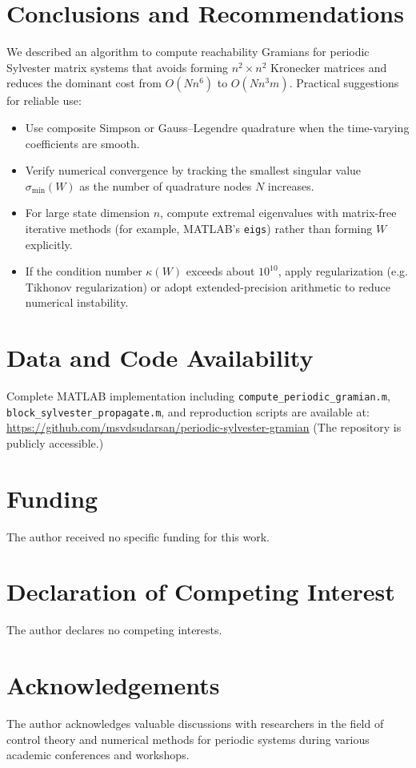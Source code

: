 \documentclass[5p,times]{elsarticle} %
\begin{document}
\section{Conclusions and Recommendations}
We described an algorithm to compute reachability Gramians for periodic Sylvester matrix systems that avoids forming \(n^2\times n^2\) Kronecker matrices and reduces the dominant cost from \(O(N n^6)\) to \(O(N n^3 m)\). Practical suggestions for reliable use:
\begin{itemize}
\item Use composite Simpson or Gauss--Legendre quadrature when the time-varying coefficients are smooth.
\item Verify numerical convergence by tracking the smallest singular value \(\sigma_{\min}(W)\) as the number of quadrature nodes \(N\) increases.
\item For large state dimension \(n\), compute extremal eigenvalues with matrix-free iterative methods (for example, MATLAB's \texttt{eigs}) rather than forming \(W\) explicitly.
\item If the condition number \(\kappa(W)\) exceeds about \(10^{10}\), apply regularization (e.g. Tikhonov regularization) or adopt extended-precision arithmetic to reduce numerical instability.
\end{itemize}

\section*{Data and Code Availability}
Complete MATLAB implementation including \texttt{compute\_periodic\_gramian.m},
\texttt{block\_sylvester\_propagate.m}, and reproduction scripts are available at:
\url{https://github.com/msvdsudarsan/periodic-sylvester-gramian}
(The repository is publicly accessible.)

\section*{Funding}
The author received no specific funding for this work.

\section*{Declaration of Competing Interest}
The author declares no competing interests.

\section*{Acknowledgements}
The author acknowledges valuable discussions with researchers in the field
of control theory and numerical methods for periodic systems during various
academic conferences and workshops.
\end{document}
